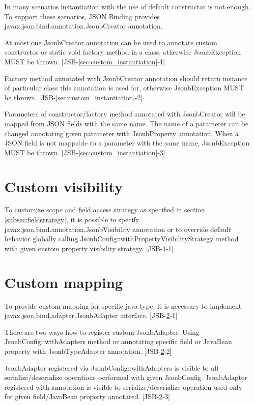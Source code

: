 In many scenarios instantiation with the use of default constructor is not enough. To support these scenarios, JSON Binding provides javax.json.bind.annotation.JsonbCreator annotation.

At most one JsonbCreator annotation can be used to annotate custom constructor or static void factory method in a class, otherwise JsonbException MUST be thrown. [JSB-\ref{sec:custom_instantiation}-1]

Factory method annotated with JsonbCreator annotation should return instance of particular class this annotation is used for, otherwise JsonbException MUST be thrown. [JSB-\ref{sec:custom_instantiation}-2]

Parameters of constructor/factory method annotated with JsonbCreator will be mapped from JSON fields with the same name. The name of a parameter can be changed annotating given parameter with JsonbProperty annotation. When a JSON field is not mappable to a parameter with the same name, JsonbException MUST be thrown. [JSB-\ref{sec:custom_instantiation}-3]

\section{Custom visibility}
\label{sec:custom_visibility}

To customize scope and field access strategy as specified in section \ref{subsec:fieldstrategy}, it is possible to specify javax.json.bind.annotation.JsonbVisibility annotation or to override default behavior globally calling JsonbConfig::withPropertyVisibilityStrategy method with given custom property visibility strategy. [JSB-\ref{sec:custom_visibility}-1]

\section{Custom mapping}
\label{sec:jsonb_adapter}

To provide custom mapping for specific java type, it is necessary to implement javax.json.bind.adapter.JsonbAdapter interface. [JSB-\ref{sec:jsonb_adapter}-1]

There are two ways how to register custom JsonbAdapter. Using JsonbConfig::withAdapters method or annotating specific field or JavaBean property with JsonbTypeAdapter annotation. [JSB-\ref{sec:jsonb_adapter}-2]

JsonbAdapter registered via JsonbConfig::withAdapters is visible to all serialize/deserialize operations performed with given JsonbConfig. JsonbAdapter registered with annotation is visible to serialize/deserialize operation used only for given field/JavaBean property annotated. [JSB-\ref{sec:jsonb_adapter}-3]


